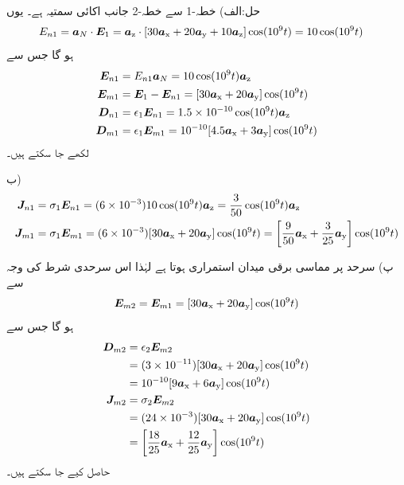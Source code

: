 حل:الف) خطہ-1 سے خطہ-2 جانب اکائی سمتیہ  ہے۔ یوں
\begin{align*}
E_{n1}&=\aN \cdot \kvec{E}_1=\az \cdot [30 \ax+20\ay+10\az] \cos (10^9 t) =10 \cos (10^9 t)
\end{align*}
ہو گا جس سے
\begin{align*}
\kvec{E}_{n1}&=E_{n1} \aN=10 \cos (10^9 t) \az\\
\kvec{E}_{m1}&=\kvec{E}_1-\kvec{E}_{n1}=[30\ax+20\ay]\cos (10^9 t)\\
\kvec{D}_{n1}&=\epsilon_1 \kvec{E}_{n1}=1.5\times 10^{-10}\cos (10^9 t) \az\\
\kvec{D}_{m1}&=\epsilon_1 \kvec{E}_{m1}=10^{-10} [4.5\ax+3\ay]\cos(10^9 t)
\end{align*}
لکھے جا سکتے ہیں۔

ب) 
\begin{align*}
\kvec{J}_{n1}&=\sigma_1 \kvec{E}_{n1}=(6\times 10^{-3})10 \cos (10^9 t) \az=\frac{3}{50}\cos (10^9 t)\az\\
\kvec{J}_{m1}&=\sigma_1 \kvec{E}_{m1}=(6\times 10^{-3})[30\ax+20\ay]\cos (10^9 t)=\left[\frac{9}{50}\ax+\frac{3}{25}\ay\right]\cos (10^9 t)
\end{align*}

پ) سرحد پر مماسی برقی میدان استمراری  ہوتا ہے لہٰذا اس سرحدی شرط کی وجہ سے
\begin{align*}
\kvec{E}_{m2}=\kvec{E}_{m1}=[30\ax+20\ay]\cos (10^9 t)
\end{align*}
ہو گا جس سے 
\begin{align*}
\kvec{D}_{m2}&=\epsilon_2 \kvec{E}_{m2}\\
&=(3\times 10^{-11})[30\ax+20\ay]\cos (10^9 t)\\
&=10^{-10}[9\ax+6\ay]\cos (10^9 t)\\
\kvec{J}_{m2}&=\sigma_2 \kvec{E}_{m2} \\
&=(24\times 10^{-3})[30\ax+20\ay]\cos (10^9 t)\\
&=\left[\frac{18}{25}\ax+\frac{12}{25}\ay\right]\cos (10^9 t)
\end{align*}
حاصل کیے جا سکتے ہیں۔

